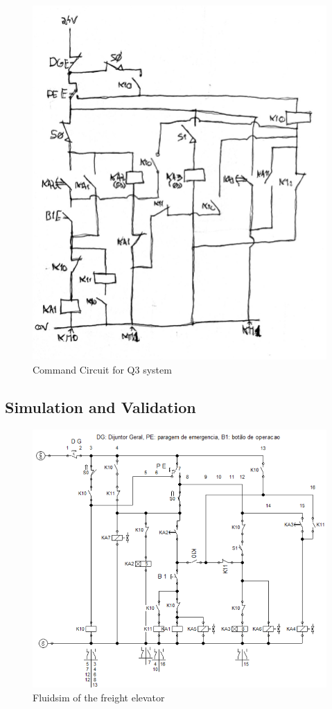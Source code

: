 \begin{figure}[H]
    \includegraphics[width=16cm]{Images/Q3/Q3_command.jpeg}
    \centering
    \caption{Command Circuit for Q3 system}
    \label{fig:Q3_command}
\end{figure}

\subsection{Simulation and Validation} \label{sec:Simulation_and_Validation}

\begin{figure}[H]
    \includegraphics[width=16cm]{Images/Q3/fluidsim_1.png}
    \centering
    \caption{Fluidsim of the freight elevator}
    \label{fig:fluidsim}
\end{figure}

